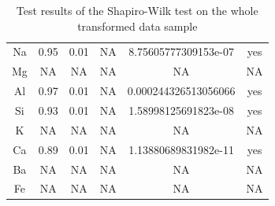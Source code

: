 \documentclass[mathserif,graphics]{beamer}
\begin{document}
{\begin{columns}[t]
\begin{table}[h!]
\begin{tabular}{|cccccc|}
Na & 0.95 & 0.01 & NA & 8.75605777309153e-07 & yes\\ 
Mg & NA & NA & NA & NA & NA\\ 
Al & 0.97 & 0.01 & NA & 0.000244326513056066 & yes\\ 
Si & 0.93 & 0.01 & NA & 1.58998125691823e-08 & yes\\ 
K & NA & NA & NA & NA & NA\\ 
Ca & 0.89 & 0.01 & NA & 1.13880689831982e-11 & yes\\ 
Ba & NA & NA & NA & NA & NA\\ 
Fe & NA & NA & NA & NA & NA\\ \hline \end{tabular}
\caption{\scriptsize Test results of the Shapiro-Wilk test on the whole
transformed data sample}
\end{table}
\vspace{15cm}
\end{columns}
}
\end{document}
